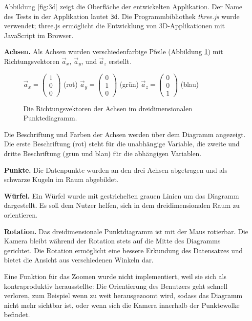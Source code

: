 Abbildung \ref{fig:3d} zeigt die Oberfläche der entwickelten Applikation. Der Name des Tests in der Applikation lautet \texttt{3d}. Die Programmbibliothek \textit{three.js} \cite{threejs} wurde verwendet; three.js ermöglicht die Entwicklung von 3D-Applikationen mit JavaScript im Browser.

\textbf{Achsen.} Als Achsen wurden verschiedenfarbige Pfeile (Abbildung \ref{fig:vectors}) mit Richtungsvektoren $\vec{a}_x$, $\vec{a}_y$, und $\vec{a}_z$ erstellt.

\begin{figure}[H]
	\centering
	$\vec{a}_x=\begin{pmatrix} 1 \\ 0 \\ 0 \end{pmatrix}$ (rot)\qquad
	$\vec{a}_y=\begin{pmatrix} 0 \\ 1 \\ 0 \end{pmatrix}$ (grün)\qquad
	$\vec{a}_z=\begin{pmatrix} 0 \\ 0 \\ 1 \end{pmatrix}$ (blau)\qquad
	\caption{Die Richtungsvektoren der Achsen im dreidimensionalen Punktediagramm.}
	\label{fig:vectors}
\end{figure}

Die Beschriftung und Farben der Achsen werden über dem Diagramm angezeigt. Die erste Beschriftung (rot) steht für die unabhängige Variable, die zweite und dritte Beschriftung (grün und blau) für die abhängigen Variablen.

\textbf{Punkte.} Die Datenpunkte wurden an den drei Achsen abgetragen und als schwarze Kugeln im Raum abgebildet.

\textbf{Würfel.} Ein Würfel wurde mit gestrichelten grauen Linien um das Diagramm dargestellt. Es soll dem Nutzer helfen, sich in dem dreidimensionalen Raum zu orientieren.

\textbf{Rotation.} Das dreidimensionale Punktdiagramm ist mit der Maus rotierbar. Die Kamera bleibt während der Rotation stets auf die Mitte des Diagramms gerichtet. Die Rotation ermöglicht eine bessere Erkundung des Datensatzes und bietet die Ansicht aus verschiedenen Winkeln dar.

Eine Funktion für das Zoomen wurde nicht implementiert, weil sie sich als kontraproduktiv herausstellte: Die Orientierung des Benutzers geht schnell verloren, zum Beispiel wenn zu weit herausgezoomt wird, sodass das Diagramm nicht mehr sichtbar ist, oder wenn sich die Kamera innerhalb der Punktewolke befindet.

